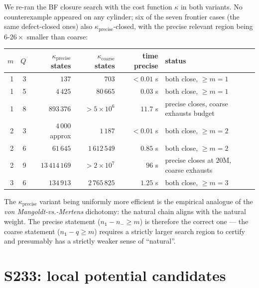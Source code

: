 \documentclass[11pt,a4paper]{article}
\theoremstyle{plain}
\theoremstyle{definition}
\newcommand{\numOnes}{n_{\mathtt{1}}}
\newcommand{\numNeg}{n_{\!-}}
\begin{document}
We re-ran the BF closure search with the cost function $\kappa$ in
both variants. No counterexample appeared on any cylinder; six of
the seven frontier cases (the same defect-closed ones) also
$\kappa_{\mathrm{precise}}$-closed, with the precise relevant region
being $6$-$26\times$ smaller than coarse:

\begin{center}\small
\begin{tabular}{rrrrrl}
\toprule
$m$ & $Q$ & $\kappa_{\mathrm{precise}}$ states & $\kappa_{\mathrm{coarse}}$ states & time precise & status \\
\midrule
1 & 3  & $137$        & $703$            & $<0.01$ s & both close, $\ge m = 1$ \\
1 & 5  & $4\,425$     & $80\,665$        & $0.03$ s  & both close, $\ge m = 1$ \\
1 & 8  & $893\,376$   & $> 5 \times 10^6$ & $11.7$ s  & precise closes, coarse exhausts budget \\
2 & 3  & $4\,000$ approx & $1\,187$      & $< 0.01$ s & both close, $\ge m = 2$ \\
2 & 6  & $61\,645$    & $1\,612\,549$    & $0.85$ s  & both close, $\ge m = 2$ \\
2 & 9  & $13\,414\,169$ & $> 2 \times 10^7$ & $96$ s  & precise closes at $20$M, coarse exhausts \\
3 & 6  & $134\,913$   & $2\,765\,825$    & $1.25$ s  & both close, $\ge m = 3$ \\
\bottomrule
\end{tabular}
\end{center}

\noindent The $\kappa_{\mathrm{precise}}$ variant being uniformly
more efficient is the empirical analogue of the
\emph{von Mangoldt-vs.-Mertens} dichotomy: the natural chain aligns
with the natural weight. The precise statement
($\numOnes - \numNeg \ge m$) is therefore the correct one — the
coarse statement ($\numOnes - q \ge m$) requires a strictly larger
search region to certify and presumably has a strictly weaker
sense of ``natural''.

\section{S233: local potential candidates}\label{sec:s233}
\end{document}

